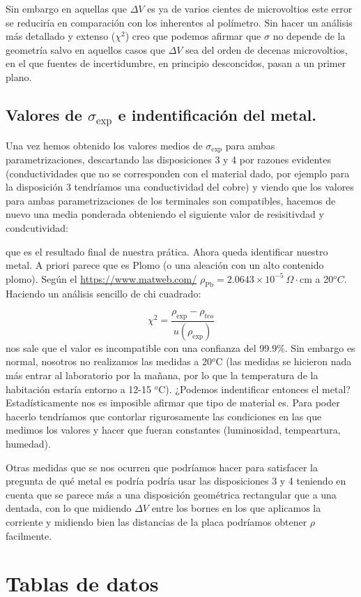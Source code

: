 \documentclass[11pt]{article}
\begin{document}
Sin embargo en aquellas que $\Delta V$ es ya de varios cientes de microvoltios este error se reduciría en comparación con los inherentes al polímetro. Sin hacer un análisis más detallado y extenso ($\chi^2$) creo que podemos afirmar que $\sigma$ no depende de la geometría salvo en aquellos casos que $\Delta V$ sea del orden de decenas microvoltios, en el que fuentes de incertidumbre, en principio desconcidos, pasan a un primer plano. 

\subsection{Valores de $\sigma_{\exp}$ e indentificación del metal.} \label{Subsec:07_02}

Una vez hemos obtenido los valores medios de $\sigma_{\exp}$ para ambas parametrizaciones, descartando las disposiciones 3 y 4 por razones evidentes (conductividades que no se corresponden con el material dado, por ejemplo para la disposición 3 tendríamos una conductividad del cobre) y viendo que los valores para ambas parametrizaciones de los terminales son compatibles, hacemos de nuevo una media ponderada obteniendo el siguiente valor de resisitivdad y condcutividad:


que es el resultado final de nuestra prática. Ahora queda identificar nuestro metal. A priori parece que es Plomo (o una aleación con un alto contenido plomo). Según el \url{https://www.matweb.com/} $\rho_{\text{Pb}}=2.0643\times 10^{-5} \ \Omega\cdot$cm a 20$^oC$. Haciendo un análisis sencillo de chi cuadrado: 

\begin{equation}
	\chi^2 = \frac{\rho_{\exp}-\rho_{teo}}{u(\rho_{\exp})} 
\end{equation}
nos sale que el valor es incompatible con una confianza del 99.9\%. Sin embargo es normal, nosotros no realizamos las medidas a 20$^o$C (las medidas se hicieron nada más entrar al laboratorio por la mañana, por lo que la temperatura de la habitación estaría entorno a 12-15 $^o$C). ¿Podemos indentificar entonces el metal? Estadísticamente nos es imposible afirmar que tipo de material es. Para poder hacerlo tendríamos que contorlar rigurosamente las condiciones en las que medimos los valores y hacer que fueran constantes (luminosidad, tempeartura, humedad). 

Otras medidas que se nos ocurren que podríamos hacer para satisfacer la pregunta de qué metal es podría podría usar las disposiciones 3 y 4 teniendo en cuenta que se parece más a una disposición geométrica rectangular que a una dentada, con lo que midiendo $\Delta V$ entre los bornes en los que aplicamos la corriente y midiendo bien las distancias de la placa podríamos obtener $\rho$ facilmente. 


\appendix

\section{Tablas de datos} \label{Appendix:A}










	
\printbibliography

	
\end{document}
